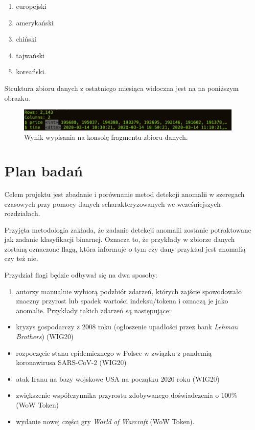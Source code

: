 \documentclass{article}
\begin{document}
\begin{enumerate}
\def\labelenumi{\arabic{enumi}.}
\item
  europejski
\item
  amerykański
\item
  chiński
\item
  tajwański
\item
  koreański.
\end{enumerate}

Struktura zbioru danych z ostatniego miesiąca widoczna jest na na
poniższym obrazku.

\begin{figure}[H]
  \centering
  \includegraphics[width=.75\textwidth]{./images/wt-glimpse.png}
  \caption{Wynik wypisania na konsolę fragmentu zbioru danych.}
\end{figure}


\section{Plan badań \label{r6}}

Celem projektu jest zbadanie i porównanie metod detekcji anomalii w
szeregach czasowych przy pomocy danych scharakteryzowanych we
wcześniejszych rozdziałach.

Przyjęta metodologia zakłada, że zadanie detekcji anomalii zostanie
potraktowane jak zadanie klasyfikacji binarnej. Oznacza to, że przykłady
w zbiorze danych zostaną oznaczone flagą, która informuje o tym czy dany
przykład jest anomalią czy też nie.

Przydział flagi będzie odbywał się na dwa sposoby:

\begin{enumerate}
\def\labelenumi{\arabic{enumi}.}
\item
  autorzy manualnie wybiorą podzbiór zdarzeń, których zajście
  spowodowało znaczny przyrost lub spadek wartości indeksu/tokena i
  oznaczą je jako anomalie. Przykłady takich zdarzeń są następujące:
\end{enumerate}

\begin{itemize}
  \item kryzys gospodarczy z 2008 roku (ogłoszenie upadłości przez bank \emph{Lehman Brothers}) (WIG20)
\item rozpoczęcie stanu epidemicznego w Polsce w związku z pandemią koronawirusa SARS-CoV-2 (WIG20)
\item atak Iranu na bazy wojskowe USA na początku 2020 roku (WIG20)
\item zwiększenie współczynnika przyrostu zdobywanego doświadczenia o $100 \%$ (WoW Token)
\item wydanie nowej części gry \emph{World of Warcraft} (WoW Token).
\end{itemize}
\end{document}
